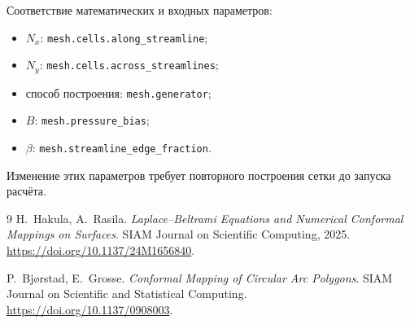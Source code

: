 \documentclass[12pt,a4paper]{article}
\begin{document}
Соответствие математических и входных параметров:
\begin{itemize}
 \item $N_x$: \texttt{mesh.cells.along\_streamline};
 \item $N_y$: \texttt{mesh.cells.across\_streamlines};
 \item способ построения: \texttt{mesh.generator};
 \item $B$: \texttt{mesh.pressure\_bias};
 \item $\beta$: \texttt{mesh.streamline\_edge\_fraction}.
\end{itemize}
Изменение этих параметров требует повторного построения сетки до запуска
расчёта.

\begin{thebibliography}{9}
H.~Hakula, A.~Rasila.
\emph{Laplace--Beltrami Equations and Numerical Conformal Mappings on Surfaces}.
SIAM Journal on Scientific Computing, 2025.
\url{https://doi.org/10.1137/24M1656840}.

P.~Bjørstad, E.~Grosse.
\emph{Conformal Mapping of Circular Arc Polygons}.
SIAM Journal on Scientific and Statistical Computing.
\url{https://doi.org/10.1137/0908003}.
\end{thebibliography}
\end{document}
